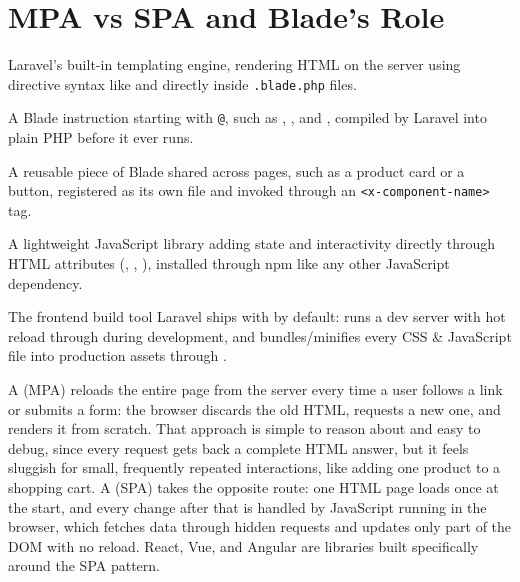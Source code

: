 \section{MPA vs SPA and Blade's Role}
\label{sec:blade-dan-tailwind-1}

\begin{istilahpenting}
\begin{description}[leftmargin=0pt,style=nextline]
  \item[Blade] Laravel's built-in templating engine, rendering HTML on the server using directive syntax like  and  directly inside \texttt{.blade.php} files.
  \item[Directive] A Blade instruction starting with \texttt{@}, such as , , and , compiled by Laravel into plain PHP before it ever runs.
  \item[Component] A reusable piece of Blade shared across pages, such as a product card or a button, registered as its own file and invoked through an \texttt{<x-component-name>} tag.
  \item[Alpine.js] A lightweight JavaScript library adding state and interactivity directly through HTML attributes (, , ), installed through npm like any other JavaScript dependency.
  \item[Vite] The frontend build tool Laravel ships with by default: runs a dev server with hot reload through  during development, and bundles/minifies every CSS \& JavaScript file into production assets through .
\end{description}
\end{istilahpenting}

A  (MPA) reloads the entire page from the
server every time a user follows a link or submits a form: the browser
discards the old HTML, requests a new one, and renders it from scratch.
That approach is simple to reason about and easy to debug, since every
request gets back a complete HTML answer, but it feels sluggish for small,
frequently repeated interactions, like adding one product to a shopping
cart. A  (SPA) takes the opposite route: one
HTML page loads once at the start, and every change after that is handled
by JavaScript running in the browser, which fetches data through hidden
requests and updates only part of the DOM with no reload. React, Vue, and
Angular are libraries built specifically around the SPA pattern.

